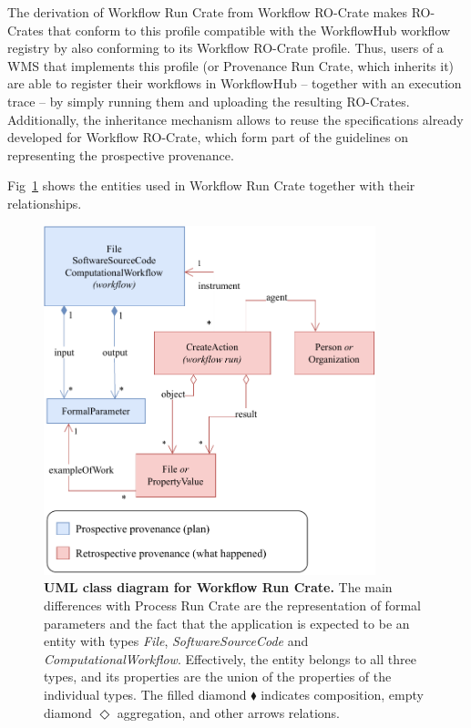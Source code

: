 \documentclass[10pt,letterpaper]{article}
\begin{document}
The derivation of Workflow Run Crate from Workflow RO-Crate makes RO-Crates that conform to this profile compatible with the WorkflowHub workflow registry by also conforming to its Workflow RO-Crate profile.
Thus, users of a WMS that implements this profile (or Provenance Run Crate, which inherits it) are able to register their workflows in WorkflowHub -- together with an execution trace -- by simply running them and uploading the resulting RO-Crates.
Additionally, the inheritance mechanism allows to reuse the specifications already developed for Workflow RO-Crate, which form part of the guidelines on representing the prospective provenance.

Fig~\ref{fig:workflow_crate_er} shows the entities used in Workflow Run Crate together with their relationships.

\begin{figure}[!h]
\includegraphics[width=26em]{wrroc-figure2.drawio.pdf}
\caption{{\bf UML class diagram for Workflow Run Crate.}
The main differences with Process Run Crate are the representation of formal parameters and the fact that the application is expected to be an entity with types \emph{File}, \emph{SoftwareSourceCode} and \emph{ComputationalWorkflow}.
Effectively, the entity belongs to all three types, and its properties are the union of the properties of the individual types.
The filled diamond $\blacklozenge$ indicates composition, empty diamond $\Diamond$ aggregation, and other arrows relations.
}
\label{fig:workflow_crate_er}
\end{figure}
\end{document}
